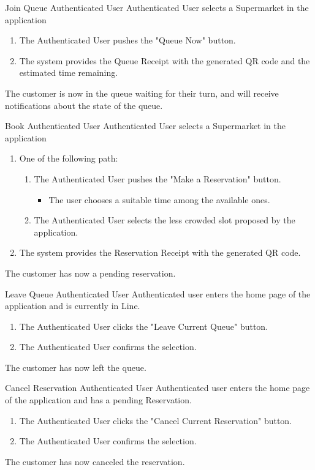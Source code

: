 \usecase
{Join Queue}
{Authenticated User}
{Authenticated User selects a Supermarket in the application}
{
        \begin{enumerate}
            \item The Authenticated User pushes the "Queue Now" button.
            \item The system provides the Queue Receipt with the generated QR code and the estimated time remaining.
        \end{enumerate}
}
{
    The customer is now in the queue waiting for their turn, and will receive notifications about the state of the queue.
}
{}
{}


\usecase
{Book}
{Authenticated User}
{Authenticated User selects a Supermarket in the application}
{
        \begin{enumerate}
            \item One of the following path:  
            \begin{enumerate}
                \item The Authenticated User pushes the "Make a Reservation" button.
                \begin{itemize}
                    \item The user chooses a suitable time among the available ones.
                \end{itemize}
                \item The Authenticated User selects the less crowded slot proposed by the application.
            \end{enumerate}
            \item The system provides the Reservation Receipt with the generated QR code.
        \end{enumerate}
}
{
    The customer has now a pending reservation.
}
{}
{}


\usecase
{Leave Queue}
{Authenticated User}
{Authenticated user enters the home page of the application and is currently in Line.}
{
    \begin{enumerate}
        \item The Authenticated User clicks the "Leave Current Queue" button.
        \item The Authenticated User confirms the selection.
    \end{enumerate}
}
{
    The customer has now left the queue.
}
{}
{}

\usecase
{Cancel Reservation}
{Authenticated User}
{Authenticated user enters the home page of the application and has a pending Reservation.}
{
    \begin{enumerate}
        \item The Authenticated User clicks the "Cancel Current Reservation" button.
        \item The Authenticated User confirms the selection.
    \end{enumerate}
}
{
    The customer has now canceled the reservation.
}
{}
{}


